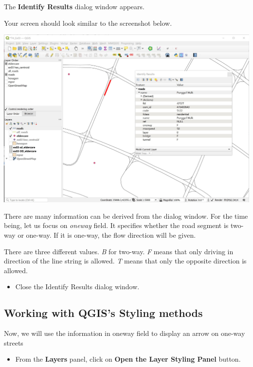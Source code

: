 \documentclass[
  letterpaper,
  DIV=11,
  numbers=noendperiod]{scrreprt}
\providecommand{\tightlist}{%
  \setlength{\itemsep}{0pt}\setlength{\parskip}{0pt}}\usepackage{longtable,booktabs,array}
\begin{document}
The \textbf{Identify Results} dialog window appears.

Your screen should look similar to the screenshot below.

\includegraphics{./img09/image7.jpg}

There are many information can be derived from the dialog window. For
the time being, let us focus on \emph{oneway} field. It specifies
whether the road segment is two-way or one-way. If it is one-way, the
flow direction will be given.

There are three different values. \emph{B} for two-way. \emph{F} means
that only driving in direction of the line string is allowed. \emph{T}
means that only the opposite direction is allowed.

\begin{itemize}
\tightlist
\item
  Close the Identify Results dialog window.
\end{itemize}

\hypertarget{working-with-qgiss-styling-methods}{%
\subsection{Working with QGIS's Styling
methods}\label{working-with-qgiss-styling-methods}}

Now, we will use the information in oneway field to display an arrow on
one-way streets

\begin{itemize}
\tightlist
\item
  From the \textbf{Layers} panel, click on \textbf{Open the Layer
  Styling Panel} button.
\end{itemize}
\end{document}
